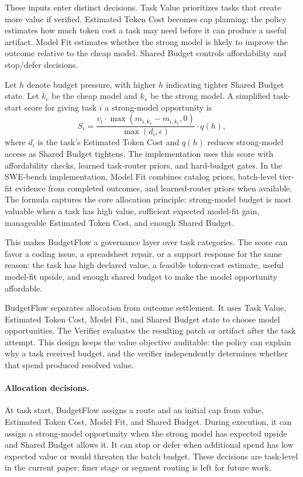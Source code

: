 \documentclass{article}
\newcommand{\method}{BudgetFlow\xspace}
\newcommand{\taskvalue}{Task Value\xspace}
\newcommand{\tokencost}{Estimated Token Cost\xspace}
\newcommand{\modelfit}{Model Fit\xspace}
\newcommand{\sharedbudget}{Shared Budget\xspace}
\newcommand{\verifier}{Verifier\xspace}
\begin{document}
These inputs enter distinct decisions. \taskvalue prioritizes tasks that create more value if verified. \tokencost becomes cap planning: the policy estimates how much token cost a task may need before it can produce a useful artifact. \modelfit estimates whether the strong model is likely to improve the outcome relative to the cheap model. \sharedbudget controls affordability and stop/defer decisions.

Let $h$ denote budget pressure, with higher $h$ indicating tighter \sharedbudget state. Let $k_c$ be the cheap model and $k_s$ be the strong model. A simplified task-start score for giving task $i$ a strong-model opportunity is
\[
    S_i =
    \frac{v_i \cdot \max(m_{i,k_s}-m_{i,k_c},0)}
    {\max(d_i,\epsilon)}
    \cdot q(h),
\]
where $d_i$ is the task's \tokencost and $q(h)$ reduces strong-model access as \sharedbudget tightens. The implementation uses this score with affordability checks, learned task-router priors, and hard-budget gates. In the SWE-bench implementation, \modelfit combines catalog priors, batch-level tier-fit evidence from completed outcomes, and learned-router priors when available. The formula captures the core allocation principle: strong-model budget is most valuable when a task has high value, sufficient expected model-fit gain, manageable \tokencost, and enough \sharedbudget.

This makes \method a governance layer over task categories. The score can favor a coding issue, a spreadsheet repair, or a support response for the same reason: the task has high declared value, a feasible token-cost estimate, useful model-fit upside, and enough shared budget to make the model opportunity affordable.

\method separates allocation from outcome settlement. It uses \taskvalue, \tokencost, \modelfit, and \sharedbudget state to choose model opportunities. The \verifier evaluates the resulting patch or artifact after the task attempt. This design keeps the value objective auditable: the policy can explain why a task received budget, and the verifier independently determines whether that spend produced resolved value.

\paragraph{Allocation decisions.}
At task start, \method assigns a route and an initial cap from value, \tokencost, \modelfit, and \sharedbudget. During execution, it can assign a strong-model opportunity when the strong model has expected upside and \sharedbudget allows it. It can stop or defer when additional spend has low expected value or would threaten the batch budget. These decisions are task-level in the current paper; finer stage or segment routing is left for future work.
\end{document}
